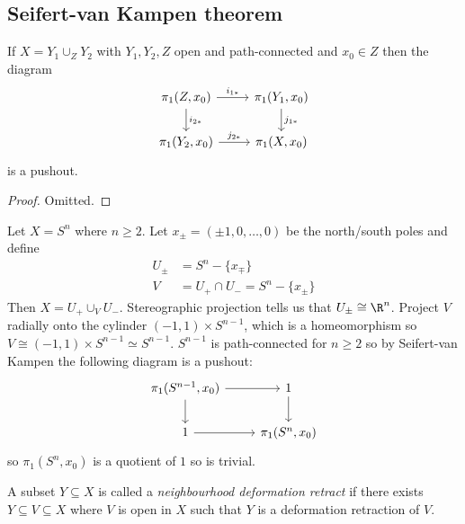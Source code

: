 \documentclass[a4paper]{article}
\begin{document}

\subsection{Seifert-van Kampen theorem}

\begin{theorem}
  If \(X = Y_1 \cup_Z Y_2\) with \(Y_1, Y_2, Z\) open and path-connected and \(x_0 \in Z\) then the diagram
  \[
    \begin{tikzcd}
      \pi_1(Z, x_0) \ar[r, "i_{1*}"] \ar[d, "i_{2*}"] & \pi_1(Y_1, x_0) \ar[d, "j_{1*}"] \\
      \pi_1(Y_2, x_0) \ar[r, "j_{2*}"] & \pi_1(X, x_0)
    \end{tikzcd}
  \]
  is a pushout.
\end{theorem}

\begin{proof}
  Omitted.
\end{proof}

\begin{eg}
  Let \(X = S^n\) where \(n \geq 2\). Let \(x_\pm = (\pm 1, 0, \dots, 0)\) be the north/south poles and define
  \begin{align*}
    U_\pm &= S^n - \{x_\mp\} \\
    V &=  U_+ \cap U_- = S^n - \{x_\pm\}
  \end{align*}
  Then \(X = U_+ \cup_V U_-\). Stereographic projection tells us that \(U_\pm \cong \R^n\). Project \(V\) radially onto the cylinder \((-1, 1) \times S^{n - 1}\), which is a homeomorphism so \(V \cong (-1, 1) \times S^{n - 1} \simeq S^{n - 1}\). \(S^{n - 1}\) is path-connected for \(n \geq 2\) so by Seifert-van Kampen the following diagram is a pushout:
  \[
    \begin{tikzcd}
      \pi_1(S^{n - 1}, x_0) \ar[r] \ar[d] & 1 \ar[d] \\
      1 \ar[r] & \pi_1(S^n, x_0)
    \end{tikzcd}
  \]
  so \(\pi_1(S^n, x_0)\) is a quotient of \(1\) so is trivial.
\end{eg}

\begin{definition}
  A subset \(Y \subseteq X\) is called a \emph{neighbourhood deformation retract} if there exists \(Y \subseteq V \subseteq X\) where \(V\) is open in \(X\) such that \(Y\) is a deformation retraction of \(V\).
\end{definition}
\end{document}
